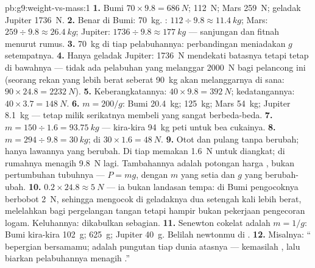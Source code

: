 \begin{solution}{pb:g9:weight-vs-mass:1}
\textbf{1.} Bumi $70 \times 9.8 = \qty{686}{N}$; 
\qty{112}{N}; Mars \qty{259}{N}; geladak Jupiter
\qty{1736}{N}.
\textbf{2.} Benar di Bumi: \qty{70}{kg}. : $112 \div
9.8 \approx \qty{11.4}{kg}$; Mars: $259 \div 9.8 \approx
\qty{26.4}{kg}$; Jupiter: $1736 \div 9.8 \approx
\qty{177}{kg}$ --- sanjungan dan fitnah menurut rumus.
\textbf{3.} \qty{70}{kg} di tiap pelabuhannya: perbandingan 
meniadakan $g$ setempatnya.
\textbf{4.} Hanya geladak Jupiter: \qty{1736}{N} mendekati batasnya
tetapi tetap di bawahnya --- tidak ada pelabuhan yang melanggar
\qty{2000}{N} bagi pelancong ini (seorang rekan yang lebih berat
seberat \qty{90}{kg} akan melanggarnya di sana:
$90 \times 24.8 = \qty{2232}{N}$).
\textbf{5.} Keberangkatannya: $40 \times 9.8 = \qty{392}{N}$;
kedatangannya: $40 \times 3.7 = \qty{148}{N}$.
\textbf{6.} $m = 200/g$: Bumi \qty{20.4}{kg}; 
\qty{125}{kg}; Mars \qty{54}{kg}; Jupiter \qty{8.1}{kg} ---
 tetap milik serikatnya membeli  yang sangat berbeda-beda.
\textbf{7.} $m = 150 \div 1.6 = \qty{93.75}{kg}$ --- kira-kira
\qty{94}{kg} peti untuk bea cukainya.
\textbf{8.} $m = 294 \div 9.8 = \qty{30}{kg}$;  di 
$30 \times 1.6 = \qty{48}{N}$.
\textbf{9.} Otot dan  pulang tanpa berubah; hanya lawannya
yang berubah. Di  tiap  memakan \qty{1.6}{N} untuk
diangkat; di rumahnya menagih \qty{9.8}{N} lagi. Tambahannya adalah
potongan harga , bukan pertumbuhan tubuhnya --- $P = m g$, dengan
$m$ yang setia dan $g$ yang berubah-ubah.
\textbf{10.} $0.2 \times 24.8 \approx \qty{5}{N}$ --- ia bukan
landasan tempa: di Bumi pengocoknya berbobot \qty{2}{N}, sehingga
mengocok di geladaknya dua setengah kali lebih berat, melelahkan bagi
pergelangan tangan tetapi hampir bukan pekerjaan pengecoran logam.
Keluhannya: dikabulkan sebagian.
\textbf{11.} Senewton cokelat adalah $m = 1/g$: Bumi kira-kira
\qty{102}{g};  \qty{625}{g}; Jupiter \qty{40}{g}. Belilah
newtonmu di .
\textbf{12.} Misalnya: `` bepergian bersamamu;  adalah
pungutan tiap dunia atasnya --- kemasilah , lalu biarkan
pelabuhannya menagih .''
\end{solution}
